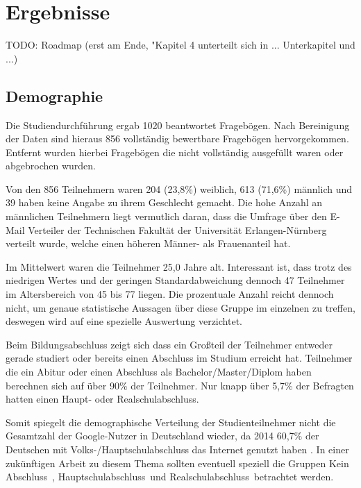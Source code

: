 %
% 

\chapter{Ergebnisse}

TODO: Roadmap (erst am Ende, "Kapitel 4 unterteilt sich in ... Unterkapitel und ...)

\section{Demographie}
\label{sec:demo}
Die Studiendurchführung ergab 1020 beantwortet Fragebögen. Nach Bereinigung der Daten sind hieraus 856 vollständig bewertbare Fragebögen hervorgekommen. Entfernt wurden hierbei Fragebögen die nicht vollständig ausgefüllt waren oder abgebrochen wurden.

Von den 856 Teilnehmern waren 204 (23,8\%) weiblich, 613 (71,6\%) männlich und 39 haben keine Angabe zu ihrem Geschlecht gemacht. Die hohe Anzahl an männlichen Teilnehmern liegt vermutlich daran, dass die Umfrage über den E-Mail Verteiler der Technischen Fakultät der Universität Erlangen-Nürnberg verteilt wurde, welche einen höheren Männer- als Frauenanteil hat.

Im Mittelwert waren die Teilnehmer 25,0 Jahre alt. Interessant ist, dass trotz des niedrigen Wertes und der geringen Standardabweichung dennoch 47 Teilnehmer im Altersbereich von 45 bis 77 liegen. Die prozentuale Anzahl reicht dennoch nicht, um genaue statistische Aussagen über diese Gruppe im einzelnen zu treffen, deswegen wird auf eine spezielle Auswertung verzichtet.

Beim Bildungsabschluss zeigt sich dass ein Großteil der Teilnehmer entweder gerade studiert oder bereits einen Abschluss im Studium erreicht hat. Teilnehmer die ein Abitur oder einen Abschluss als Bachelor/Master/Diplom haben berechnen sich auf über 90\% der Teilnehmer. Nur knapp über 5,7\% der Befragten hatten einen Haupt- oder Realschulabschluss.

Somit spiegelt die demographische Verteilung der Studienteilnehmer nicht die Gesamtzahl der Google-Nutzer in Deutschland wieder, da 2014 60,7\% der Deutschen mit Volks-/Hauptschulabschluss das Internet genutzt haben \cite{statistabildung}. In einer zukünftigen Arbeit zu diesem Thema sollten eventuell speziell die Gruppen \glqq Kein Abschluss\grqq\ , \glqq Hauptschulabschluss\grqq\ und \glqq Realschulabschluss\grqq\ betrachtet werden.

